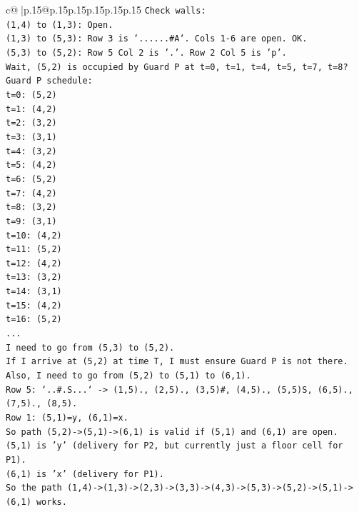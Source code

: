 \documentclass{article}
\begin{document}
{\begin{supertabular}{c@{$\;$}|p{.15\linewidth}@{}p{.15\linewidth}p{.15\linewidth}p{.15\linewidth}p{.15\linewidth}p{.15\linewidth}}
{{{\texttt{Check walls:} \\
\texttt{(1,4) to (1,3): Open.} \\
\texttt{(1,3) to (5,3): Row 3 is `......\#A`. Cols 1{-}6 are open. OK.} \\
\texttt{(5,3) to (5,2): Row 5 Col 2 is '.'. Row 2 Col 5 is 'p'.} \\
\texttt{Wait, (5,2) is occupied by Guard P at t=0, t=1, t=4, t=5, t=7, t=8?} \\
\texttt{Guard P schedule:} \\
\texttt{t=0: (5,2)} \\
\texttt{t=1: (4,2)} \\
\texttt{t=2: (3,2)} \\
\texttt{t=3: (3,1)} \\
\texttt{t=4: (3,2)} \\
\texttt{t=5: (4,2)} \\
\texttt{t=6: (5,2)} \\
\texttt{t=7: (4,2)} \\
\texttt{t=8: (3,2)} \\
\texttt{t=9: (3,1)} \\
\texttt{t=10: (4,2)} \\
\texttt{t=11: (5,2)} \\
\texttt{t=12: (4,2)} \\
\texttt{t=13: (3,2)} \\
\texttt{t=14: (3,1)} \\
\texttt{t=15: (4,2)} \\
\texttt{t=16: (5,2)} \\
\texttt{...} \\
\texttt{I need to go from (5,3) to (5,2).} \\
\texttt{If I arrive at (5,2) at time T, I must ensure Guard P is not there.} \\
\texttt{Also, I need to go from (5,2) to (5,1) to (6,1).} \\
\texttt{Row 5: `..\#.S...` {-}> (1,5)., (2,5)., (3,5)\#, (4,5)., (5,5)S, (6,5)., (7,5)., (8,5).} \\
\texttt{Row 1: (5,1)=y, (6,1)=x.} \\
\texttt{So path (5,2){-}>(5,1){-}>(6,1) is valid if (5,1) and (6,1) are open.} \\
\texttt{(5,1) is 'y' (delivery for P2, but currently just a floor cell for P1).} \\
\texttt{(6,1) is 'x' (delivery for P1).} \\
\texttt{So the path (1,4){-}>(1,3){-}>(2,3){-}>(3,3){-}>(4,3){-}>(5,3){-}>(5,2){-}>(5,1){-}>(6,1) works.} \\
}}}
\end{supertabular}}
\end{document}
